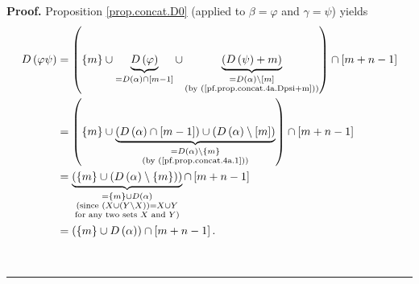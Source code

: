 \documentclass[numbers=enddot,12pt,final,onecolumn,notitlepage]{scrartcl}%
\theoremstyle{definition}
\newenvironment{proof}[1][Proof]{\noindent\textbf{#1.} }{\ \rule{0.5em}{0.5em}}
\begin{document}
\begin{proof}
Proposition \ref{prop.concat.D0} (applied to $\beta=\varphi$ and $\gamma=\psi
$) yields
\begin{align}
D\left(  \varphi\psi\right)   &  =\left(  \left\{  m\right\}  \cup
\underbrace{D\left(  \varphi\right)  }_{=D\left(  \alpha\right)  \cap\left[
m-1\right]  }\cup\underbrace{\left(  D\left(  \psi\right)  +m\right)
}_{\substack{=D\left(  \alpha\right)  \setminus\left[  m\right]  \\\text{(by
(\ref{pf.prop.concat.4a.Dpsi+m}))}}}\right)  \cap\left[  m+n-1\right]
\nonumber\\
&  =\left(  \left\{  m\right\}  \cup\underbrace{\left(  D\left(
\alpha\right)  \cap\left[  m-1\right]  \right)  \cup\left(  D\left(
\alpha\right)  \setminus\left[  m\right]  \right)  }_{\substack{=D\left(
\alpha\right)  \setminus\left\{  m\right\}  \\\text{(by
(\ref{pf.prop.concat.4a.1}))}}}\right)  \cap\left[  m+n-1\right] \nonumber\\
&  =\underbrace{\left(  \left\{  m\right\}  \cup\left(  D\left(
\alpha\right)  \setminus\left\{  m\right\}  \right)  \right)  }%
_{\substack{=\left\{  m\right\}  \cup D\left(  \alpha\right)  \\\text{(since
}\left(  X\cup\left(  Y\setminus X\right)  \right)  =X\cup Y\\\text{for any
two sets }X\text{ and }Y\text{)}}}\cap\left[  m+n-1\right] \nonumber\\
&  =\left(  \left\{  m\right\}  \cup D\left(  \alpha\right)  \right)
\cap\left[  m+n-1\right]  . \label{pf.prop.concat.4a.3}%
\end{align}



\end{proof}
\end{document}
